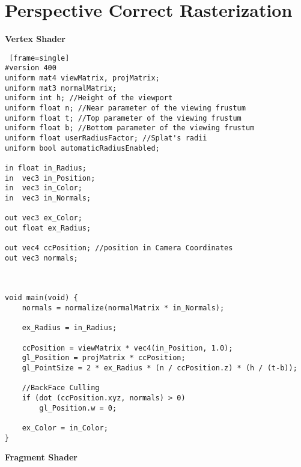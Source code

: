 \section{Perspective Correct Rasterization \label{perspective}}

\textbf{Vertex Shader}
\begin{lstlisting} [frame=single]
#version 400
uniform mat4 viewMatrix, projMatrix;
uniform mat3 normalMatrix;
uniform int h; //Height of the viewport
uniform float n; //Near parameter of the viewing frustum
uniform float t; //Top parameter of the viewing frustum
uniform float b; //Bottom parameter of the viewing frustum
uniform float userRadiusFactor; //Splat's radii
uniform bool automaticRadiusEnabled;

in float in_Radius;
in  vec3 in_Position;
in  vec3 in_Color;
in 	vec3 in_Normals;

out vec3 ex_Color;
out float ex_Radius;

out vec4 ccPosition; //position in Camera Coordinates
out vec3 normals;



void main(void) {
	normals = normalize(normalMatrix * in_Normals);

	ex_Radius = in_Radius;

	ccPosition = viewMatrix * vec4(in_Position, 1.0);
	gl_Position = projMatrix * ccPosition;
	gl_PointSize = 2 * ex_Radius * (n / ccPosition.z) * (h / (t-b));

	//BackFace Culling
	if (dot (ccPosition.xyz, normals) > 0)
		gl_Position.w = 0;

	ex_Color = in_Color;
}
\end{lstlisting}
\newpage
\textbf{Fragment Shader}
